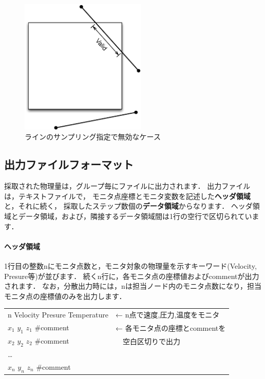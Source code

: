 \begin{figure}[htbp]
\begin{center}
\includegraphics[width=6cm,clip]{Invalid_case.eps}
\end{center}
\caption{ラインのサンプリング指定で無効なケース}
\label{fig:invalid_case}
\end{figure}


\subsection{出力ファイルフォーマット}
採取された物理量は，グループ毎にファイルに出力されます．
出力ファイルは，テキストファイルで，
モニタ点座標とモニタ変数を記述した{\bf ヘッダ領域}と，それに続く，
採取したステップ数個の{\bf データ領域}からなります．
ヘッダ領域とデータ領域，および，隣接するデータ領域間は1行の空行で区切られています．

\paragraph{ヘッダ領域}
1行目の整数nにモニタ点数と，モニタ対象の物理量を示すキーワード(Velocity, Presure等)が並びます．
続くn行に，各モニタ点の座標値およびcommentが出力されます．
なお，分散出力時には，nは担当ノード内のモニタ点数になり，担当モニタ点の座標値のみを出力します．
\begin{center}
\vspace{0.2\baselineskip}
\begin{tabular}{|p{14em}|p{20em}}\cline{1-1}
n Velocity Presure Temperature  & ← n点で速度,圧力,温度をモニタ\\ 
$x_1$  $y_1$  $z_1$  \#comment  & ← 各モニタ点の座標とcommentを\\
$x_2$  $y_2$  $z_2$  \#comment  & 　空白区切りで出力\\
  …                   & \\
$x_n$ $y_n$ $z_n$    \#comment & \\
\cline{1-1}
\end{tabular}
\vspace{0.2\baselineskip}
\end{center}

